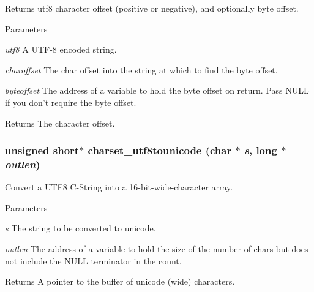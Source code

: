 Returns utf8 character offset (positive or negative), and optionally byte offset. 
\begin{DoxyParams}{Parameters}
\item[{\em utf8}]A UTF-\/8 encoded string. \item[{\em charoffset}]The char offset into the string at which to find the byte offset. \item[{\em byteoffset}]The address of a variable to hold the byte offset on return. Pass NULL if you don't require the byte offset. \end{DoxyParams}
\begin{DoxyReturn}{Returns}
The character offset. 
\end{DoxyReturn}
\hypertarget{group__unicode_ga3f69447412c37263c41fcb1d3a69f3ec}{
\subsubsection[{charset\_\-utf8tounicode}]{\setlength{\rightskip}{0pt plus 5cm}unsigned short$\ast$ charset\_\-utf8tounicode (char $\ast$ {\em s}, \/  long $\ast$ {\em outlen})}}
\label{group__unicode_ga3f69447412c37263c41fcb1d3a69f3ec}


Convert a UTF8 C-\/String into a 16-\/bit-\/wide-\/character array. 
\begin{DoxyParams}{Parameters}
\item[{\em s}]The string to be converted to unicode. \item[{\em outlen}]The address of a variable to hold the size of the number of chars but does not include the NULL terminator in the count. \end{DoxyParams}
\begin{DoxyReturn}{Returns}
A pointer to the buffer of unicode (wide) characters. 
\end{DoxyReturn}

